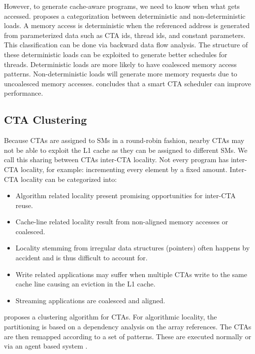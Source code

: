 \documentclass{article}
\newcommand{\TODO}[1]{\noindent{\color{red}\textbf{[TODO] #1}}}
\begin{document}
However, to generate cache-aware programs, we need to know when what gets accessed.
\citet{koo2015revealing} proposes a categorization between deterministic and non-deterministic loads.
A memory access is deterministic when the referenced address is generated from parameterized data such as CTA ids, thread ids, and constant parameters.
This classification can be done via backward data flow analysis. The structure of these deterministic loads can be exploited to generate better schedules for threads.
Deterministic loads are more likely to have coalesced memory access patterns. 
Non-deterministic loads will generate more memory requests due to uncoalesced memory accesses.
\citet{koo2015revealing} concludes that a smart CTA scheduler can improve performance.

\subsection{CTA Clustering}
Because CTAs are assigned to SMs in a round-robin fashion, nearby CTAs may not be able to exploit the L1 cache as they can be assigned to different SMs.
We call this sharing between CTAs inter-CTA locality.
Not every program has inter-CTA locality, for example: incrementing every element by a fixed amount.
Inter-CTA locality can be categorized into:
\begin{itemize}
    \item Algorithm related locality present promising opportunities for inter-CTA reuse.
    \item Cache-line related locality result from non-aligned memory accesses or coalesced.
    \item Locality stemming from irregular data structures (pointers) often happens by accident and is thus difficult to account for.
    \item Write related applications may suffer when multiple CTAs write to the same cache line causing an eviction in the L1 cache.
    \item Streaming applications are coalesced and aligned.
\end{itemize}
\citet{li2017locality} proposes a clustering algorithm for CTAs.
For algorithmic locality, the partitioning is based on a dependency analysis on the array references.
The CTAs are then remapped according to a set of patterns.
These are executed normally or via an agent based system \cite{li2017locality}.
\TODO{Relate to proposal}
\end{document}
